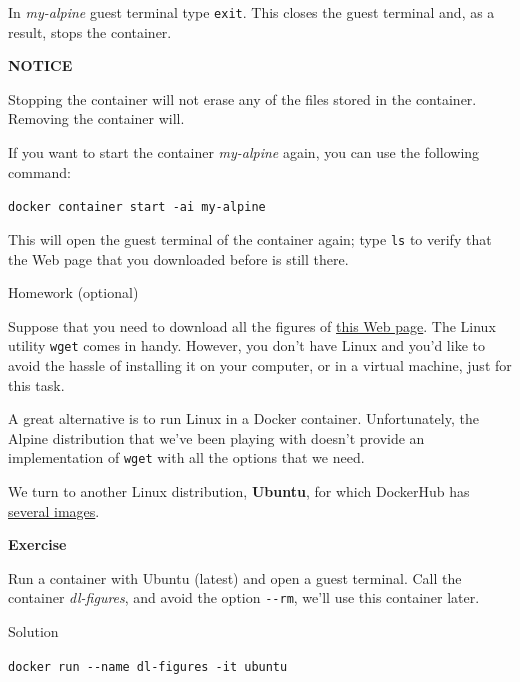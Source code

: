 \documentclass[
]{article}
\newenvironment{infobox}[1]
  {
  \begin{itemize}
  \renewcommand{\labelitemi}{
    \raisebox{-.7\height}[0pt][0pt]{
      
    }
  }
  \setlength{\fboxsep}{1em}
  \begin{whitebox}
  \item
  }
  {
  \end{whitebox}
  \end{itemize}
  }
\theoremstyle{definition}
\theoremstyle{definition}
\theoremstyle{definition}
\theoremstyle{remark}
\let\BeginKnitrBlock\begin \let\EndKnitrBlock\end
\begin{document}
In \emph{my-alpine} guest terminal type \texttt{exit}.
This closes the guest terminal and, as a result, stops the
container.

\begin{infobox}{warning}
\textbf{NOTICE}

Stopping the container will not erase any of the files
stored in the container. Removing the container will.

\end{infobox}

If you want to start the container \emph{my-alpine} again, you can
use the following command:

\texttt{docker\ container\ start\ -ai\ my-alpine}

This will open the guest terminal of the container again;
type \texttt{ls} to verify that
the Web page that you downloaded before is still there.

Homework (optional)

Suppose that you need to download all the figures of
\href{https://www.centralesupelec.fr/fr/presentation}{this Web page}.
The Linux utility \texttt{wget} comes in handy.
However, you don't have Linux and you'd like to
avoid the hassle of installing it on your computer, or in a virtual machine,
just for this task.

A great alternative is to run Linux in a Docker container.
Unfortunately, the Alpine distribution that we've been playing
with doesn't provide
an implementation of \texttt{wget} with all the options that we need.

We turn to another Linux distribution, \textbf{Ubuntu},
for which DockerHub has
\href{https://hub.docker.com/_/ubuntu/}{several images}.

\begin{infobox}{exercisebox}

\textbf{Exercise}

\BeginKnitrBlock{exercise}
\label{exr:unnamed-chunk-11}{\label{exr:unnamed-chunk-11} }Run a container with Ubuntu (latest) and open a guest terminal.
Call the container \emph{dl-figures}, and avoid the option
\texttt{-\/-rm}, we'll use this container later.
\EndKnitrBlock{exercise}

\end{infobox}

Solution

\begin{infobox}{exercisebox}
\texttt{docker\ run\ -\/-name\ dl-figures\ -it\ ubuntu}

\end{infobox}
\end{document}
